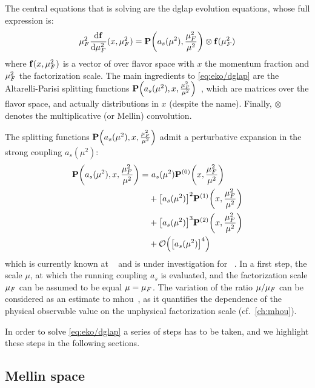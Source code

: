
The central equations that \eko is solving are the \acrfull{dglap} evolution
equations, whose full expression is:
\begin{equation}
  \muF^2 \dv{\vb f}{\muF^2}{}(x,\muF^2) = \vb P\qty(a_s(\mu^2),\frac{\muF^2}{\mu^2}) \otimes \vb f(\muF^2)
	\label{eq:eko/dglap}
\end{equation}
where $\vb f(x,\mu_F^2)$ is a vector of \pdfs over flavor space with $x$ the
momentum fraction and $\mu_F^2$ the factorization scale. The main ingredients to
\cref{eq:eko/dglap} are the Altarelli-Parisi splitting functions $\vb
P\qty(a_s(\mu^2),x,\frac{\mu_F^2}{\mu^2})$~\cite{Moch:2004pa,Vogt:2004mw}, which
are matrices over the flavor space, and actually distributions in $x$ (despite
the name).
Finally, $\otimes$ denotes the multiplicative (or Mellin) convolution.

The splitting functions $\vb P\qty(a_s(\mu^2),x,\frac{\mu_F^2}{\mu^2})$ admit a
perturbative expansion in the strong coupling $a_s(\mu^2)$:
\begin{align}
  \vb P\qty(a_s(\mu^2),x,\frac{\muF^2}{\mu^2}) =
  &~ a_s(\mu^2) \vb P^{(0)}\qty(x,\frac{\muF^2}{\mu^2})\nonumber\\
  &+ \qty[a_s(\mu^2)]^2 \vb P^{(1)}\qty(x,\frac{\muF^2}{\mu^2})\nonumber\\
  &+ \qty[a_s(\mu^2)]^3 \vb P^{(2)}\qty(x,\frac{\muF^2}{\mu^2})\nonumber\\
  &+ \order{\qty[a_s(\mu^2)]^4}
\end{align}
which is currently known at \nnlo{}~\cite{Moch:2004pa,Vogt:2004mw,Blumlein:2021enk} and is under
investigation for \nnnlo{}~\cite{Moch:2021qrk}.
In a first step, the scale $\mu$, at which the running coupling $a_s$ is
evaluated, and the factorization scale $\mu_F$ can be assumed to be equal $\mu =
\mu_F$.
The variation of the ratio $\mu/\mu_F$ can be considered as an estimate to
\acrfull{mhou}~\cite{AbdulKhalek:2019ihb}, as it quantifies the dependence of
the physical observable value on the unphysical factorization scale (cf.\
\cref{ch:mhou}).

In order to solve \cref{eq:eko/dglap} a series of steps has to be taken, and we
highlight these steps in the following sections.

\subsection{Mellin space}
\label{sec:eko/theory-mellin}


